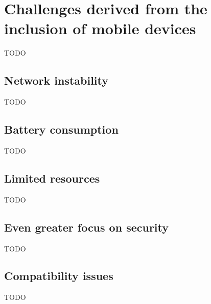 \section{Challenges derived from the inclusion of mobile devices}
TODO

\subsection{Network instability}
TODO

\subsection{Battery consumption}
TODO

\subsection{Limited resources}
TODO

\subsection{Even greater focus on security}
TODO

\subsection{Compatibility issues}
TODO
